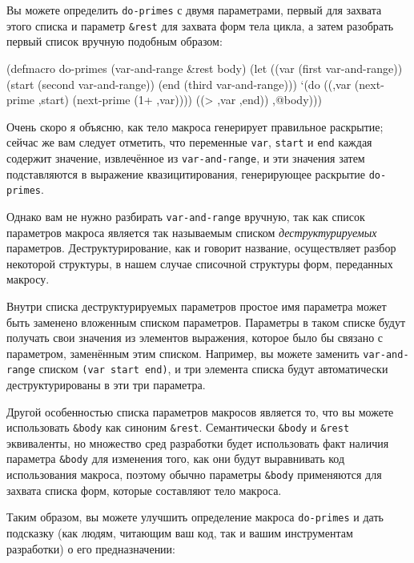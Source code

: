Вы можете определить \lstinline{do-primes} с двумя параметрами, первый для захвата этого списка
и параметр \lstinline!&rest! для захвата форм тела цикла, а затем разобрать первый список
вручную подобным образом:

\begin{myverb}
(defmacro do-primes (var-and-range &rest body)
  (let ((var (first var-and-range))
        (start (second var-and-range))
        (end (third var-and-range)))
    `(do ((,var (next-prime ,start) (next-prime (1+ ,var))))
         ((> ,var ,end))
       ,@body)))
\end{myverb}

Очень скоро я объясню, как тело макроса генерирует правильное раскрытие; сейчас же вам
следует отметить, что переменные \lstinline{var}, \lstinline{start} и \lstinline{end} каждая содержит
значение, извлечённое из \lstinline{var-and-range}, и эти значения затем подставляются в
выражение квазицитирования, генерирующее раскрытие \lstinline{do-primes}.

Однако вам не нужно разбирать \lstinline{var-and-range} вручную, так как список параметров
макроса является так называемым списком \textit{деструктурируемых}
параметров. Деструктурирование, как и говорит название, осуществляет разбор некоторой
структуры, в нашем случае списочной структуры форм, переданных макросу.

Внутри списка деструктурируемых параметров простое имя параметра может быть заменено
вложенным списком параметров. Параметры в таком списке будут получать свои значения из
элементов выражения, которое было бы связано с параметром, заменённым этим
списком. Например, вы можете заменить \lstinline{var-and-range} списком \lstinline{(var start end)},
и три элемента списка будут автоматически деструктурированы в эти три параметра.

Другой особенностью списка параметров макросов является то, что вы можете использовать
\lstinline!&body! как синоним \lstinline!&rest!. Семантически \lstinline!&body! и
\lstinline!&rest! эквиваленты, но множество сред разработки будет использовать факт
наличия параметра \lstinline!&body! для изменения того, как они будут выравнивать код
использования макроса, поэтому обычно параметры \lstinline!&body! применяются для захвата
списка форм, которые составляют тело макроса.

Таким образом, вы можете улучшить определение макроса \lstinline{do-primes} и дать подсказку
(как людям, читающим ваш код, так и вашим инструментам разработки) о его предназначении:

